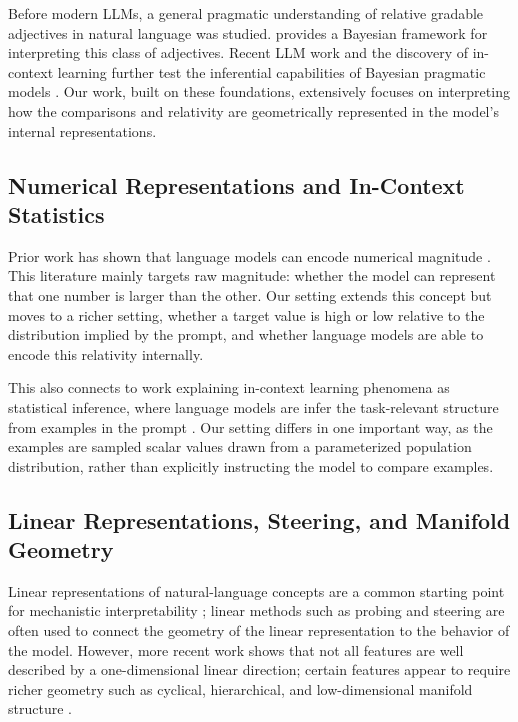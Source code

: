 \documentclass{article}
\begin{document}
Before modern LLMs, a general pragmatic understanding of relative gradable adjectives in natural language was studied. \citet{lassiter2017adjectival} provides a Bayesian framework for interpreting this class of adjectives. Recent LLM work and the discovery of in-context learning further test the inferential capabilities of Bayesian pragmatic models \citep{lipkin2023pragmatic}. Our work, built on these foundations, extensively focuses on interpreting how the comparisons and relativity are geometrically represented in the model's internal representations.

\subsection{Numerical Representations and In-Context Statistics}
\label{subsec:related-numbers}

Prior work has shown that language models can encode numerical magnitude \citep{zhu2024value}. This literature mainly targets raw magnitude: whether the model can represent that one number is larger than the other. Our setting extends this concept but moves to a richer setting, whether a target value is high or low relative to the distribution implied by the prompt, and whether language models are able to encode this relativity internally.

This also connects to work explaining in-context learning phenomena as statistical inference, where language models are infer the task-relevant structure from examples in the prompt \citep{xie2022implicitbayesian,he2025linearregression}. Our setting differs in one important way, as the examples are sampled scalar values drawn from a parameterized population distribution, rather than explicitly instructing the model to compare examples.

\subsection{Linear Representations, Steering, and Manifold Geometry}
\label{subsec:related-mi}

Linear representations of natural-language concepts are a common starting point for mechanistic interpretability \citep{park2024linear,park2025categorical}; linear methods such as probing and steering are often used to connect the geometry of the linear representation to the behavior of the model.
However, more recent work shows that not all features are well described by a one-dimensional linear direction; certain features appear to require richer geometry such as cyclical, hierarchical, and low-dimensional manifold structure \citep{engels2024notlinear,modellerubin2025manifolds,sarfati2026beliefs,gurnee2026manifold}.
\end{document}
